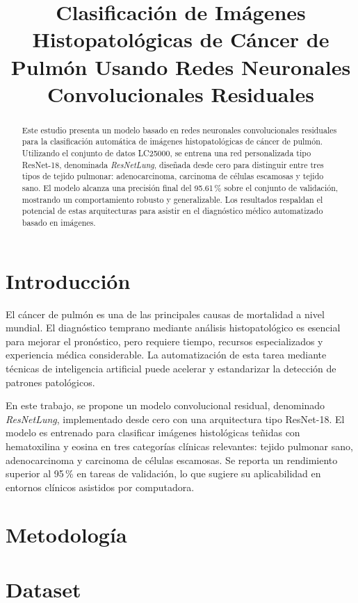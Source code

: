 \documentclass[conference]{IEEEtran}
\title{Clasificaci\'on de Im\'agenes Histopatol\'ogicas de C\'ancer de Pulm\'on Usando Redes Neuronales Convolucionales Residuales}
\author{\IEEEauthorblockN{Joel Ibaceta}
\IEEEauthorblockA{\textit{Universidad Nacional de Ingenieria} \\
joel.ibaceta.c@uni.pe}}
\begin{document}
\maketitle

\begin{abstract}
Este estudio presenta un modelo basado en redes neuronales convolucionales residuales para la clasificación automática de imágenes histopatológicas de cáncer de pulmón. Utilizando el conjunto de datos LC25000, se entrena una red personalizada tipo ResNet-18, denominada \textit{ResNetLung}, diseñada desde cero para distinguir entre tres tipos de tejido pulmonar: adenocarcinoma, carcinoma de células escamosas y tejido sano. El modelo alcanza una precisión final del 95.61 \% sobre el conjunto de validación, mostrando un comportamiento robusto y generalizable. Los resultados respaldan el potencial de estas arquitecturas para asistir en el diagnóstico médico automatizado basado en imágenes.
\end{abstract}

\section{Introducci\'on}

El cáncer de pulmón es una de las principales causas de mortalidad a nivel mundial. El diagnóstico temprano mediante análisis histopatológico es esencial para mejorar el pronóstico, pero requiere tiempo, recursos especializados y experiencia médica considerable. La automatización de esta tarea mediante técnicas de inteligencia artificial puede acelerar y estandarizar la detección de patrones patológicos.

En este trabajo, se propone un modelo convolucional residual, denominado \textit{ResNetLung}, implementado desde cero con una arquitectura tipo ResNet-18. El modelo es entrenado para clasificar imágenes histológicas teñidas con hematoxilina y eosina en tres categorías clínicas relevantes: tejido pulmonar sano, adenocarcinoma y carcinoma de células escamosas. Se reporta un rendimiento superior al 95 \% en tareas de validación, lo que sugiere su aplicabilidad en entornos clínicos asistidos por computadora.

\section{Metodolog\'ia}

\section{Dataset}
\end{document}
